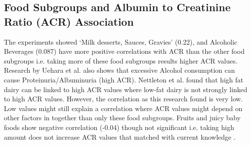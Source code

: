 \subsection{Food Subgroups and Albumin to Creatinine Ratio (ACR) Association}

\noindent The experiments showed  `Milk desserts, Sauces, Gravies' (0.22), and Alcoholic Beverages (0.087) have more positive correlations with ACR than the other food subgroups  i.e. taking more of these food subgroups results higher ACR values. Research by Uehara et al. \cite{Ueharaetal2016} also shows that excessive Alcohol consumption can cause Proteinuria/Albuminuria (high ACR). Nettleton et al. \cite{Nettletonetal2008} found that high fat dairy can be linked to high ACR values where low-fat dairy is not strongly linked to high ACR values. However, the correlation as this research found is very low. Low values might still explain a correlation where ACR values might depend on other factors in together than only these food subgroups. Fruits and juicy baby foods show negative correlation (-0.04) though not significant i.e. taking high amount does not increase ACR values that matched with current knowledge \cite{Jacobsetal2009}.